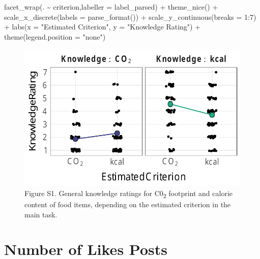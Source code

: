 \documentclass[
  letterpaper,
  DIV=11,
  numbers=noendperiod]{scrartcl}
\newenvironment{Shaded}{\begin{snugshade}}{\end{snugshade}}
\newcommand{\AttributeTok}[1]{\textcolor[rgb]{0.40,0.45,0.13}{#1}}
\newcommand{\DecValTok}[1]{\textcolor[rgb]{0.68,0.00,0.00}{#1}}
\newcommand{\FunctionTok}[1]{\textcolor[rgb]{0.28,0.35,0.67}{#1}}
\newcommand{\NormalTok}[1]{\textcolor[rgb]{0.00,0.23,0.31}{#1}}
\newcommand{\SpecialCharTok}[1]{\textcolor[rgb]{0.37,0.37,0.37}{#1}}
\newcommand{\StringTok}[1]{\textcolor[rgb]{0.13,0.47,0.30}{#1}}
\begin{document}
\begin{Shaded}
\begin{Highlighting}[]
    \FunctionTok{facet\_wrap}\NormalTok{(. }\SpecialCharTok{\textasciitilde{}}\NormalTok{ criterion,}\AttributeTok{labeller =}\NormalTok{ label\_parsed) }\SpecialCharTok{+}
    \FunctionTok{theme\_nice}\NormalTok{() }\SpecialCharTok{+}
    \FunctionTok{scale\_x\_discrete}\NormalTok{(}\AttributeTok{labels =} \FunctionTok{parse\_format}\NormalTok{()) }\SpecialCharTok{+}
    \FunctionTok{scale\_y\_continuous}\NormalTok{(}\AttributeTok{breaks =} \DecValTok{1}\SpecialCharTok{:}\DecValTok{7}\NormalTok{) }\SpecialCharTok{+}
    \FunctionTok{labs}\NormalTok{(}\AttributeTok{x =} \StringTok{"Estimated Criterion"}\NormalTok{,}
         \AttributeTok{y =} \StringTok{"Knowledge Rating"}\NormalTok{) }\SpecialCharTok{+}
    \FunctionTok{theme}\NormalTok{(}\AttributeTok{legend.position =} \StringTok{"none"}\NormalTok{) }
\end{Highlighting}
\end{Shaded}

\begin{figure}[H]

{\centering \includegraphics{supplement_files/figure-pdf/unnamed-chunk-3-1.pdf}

}

\caption{Figure S1. General knowledge ratings for C0\textsubscript{2}
footprint and calorie content of food items, depending on the estimated
criterion in the main task.}

\end{figure}%

\section{Number of Likes Posts}\label{number-of-likes-posts}
\end{document}
